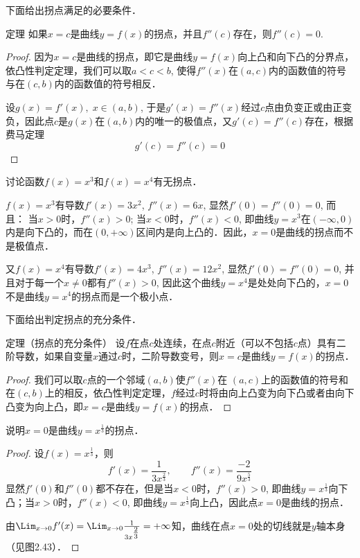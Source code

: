 下面给出拐点满足的必要条件．

\begin{blk}
    {定理} 如果$x=c$是曲线$y=f(x)$的拐点，并且$f''(c)$存在，则$f''(c)=0$.
\end{blk}

\begin{proof}
    因为$x=c$是曲线的拐点，即它是曲线$y=f(x)$向上凸和向下凸的分界点，依凸性判定定理，我们可以取$a<c<b$, 使得$f''(x)$在$(a,c)$内的函数值的符号与在$(c,b)$内的函数值的符号相反．

设$g(x)=f'(x),\; x\in (a,b)$, 于是$g'(x)=f''(x)$经过$c$点由负变正或由正变负，因此点$c$是$g(x)$在$(a,b)$内的唯一的极值点，又$g'(c)=f''(c)$存在，根据费马定理
\[g' (c) =f'' (c) =0\]
\end{proof}


\begin{example}
    讨论函数$f(x)=x^3$和$f(x)=x^4$有无拐点．
\end{example}


\begin{solution}
    $f(x)=x^3$有导数$f'(x)=3x^2$, $f''(x)=6x$, 显然$f'(0)=f''(0)=0$, 而且：
当$x>0$时，$f''(x)>0$; 当$x<0$时，$f''(x)<0$, 即曲线$y=x^3$在$(-\infty, 0)$内是向下凸的，而在$(0,+\infty)$区间内是向上凸的．因此，$x=0$是曲线的拐点而不是极值点．

又$f(x)=x^4$有导数$f'(x)=4x^3$, $f''(x)=12x^2$, 显然$f'(0)=f''(0)=0$, 并且对于每一个$x\ne 0$都有$f''(x)>0$, 因此这个曲线$y=x^4$是处处向下凸的，$x=0$不是曲线$y=x^4$的拐点而是一个极小点．
\end{solution}


下面给出判定拐点的充分条件．
    
\begin{blk}
   {定理（拐点的充分条件）} 设$f$在点$c$处连续，在点$c$附近（可以不包括$c$点）具有二阶导数，如果自变量$x$通过$c$时，二阶导数变号，则$x=c$是曲线$y=f(x)$的拐点．
\end{blk}

\begin{proof}
    我们可以取$c$点的一个邻域$(a,b)$使$f''(x)$在
$(a,c)$上的函数值的符号和在$(c,b)$上的相反，依凸性判定定理，$f$经过$c$时将由向上凸变为向下凸或者由向下凸变为向上凸，即$x=c$是曲线$y=f(x)$的拐点．
\end{proof}


\begin{example}
说明$x=0$是曲线$y=x^{\tfrac{1}{3}}$的拐点．
\end{example}

\begin{proof}
    设$f(x)=x^{\tfrac{1}{3}}$，则
\[f'(x)=\frac{1}{3x^{\tfrac{2}{3}}},\qquad f''(x)=\frac{-2}{9x^{\tfrac{5}{3}}}\]
显然$f'(0)$和$f''(0)$都不存在，但是当$x<0$时，$f''(x)>0$, 即曲线$y=x^{\tfrac{1}{3}}$向下凸；当$x>0$时，$f''(x)<0$, 即曲线$y=x^{\tfrac{1}{3}}$向上凸，因此点$x=0$是曲线的拐点．

由$\Lim_{x\to 0}f'(x)=\Lim_{x\to 0}\frac{1}{3x^{\tfrac{2}{3}}}=+\infty$知，曲线在点$x=0$处的切线就是$y$轴本身（见图2.43）．
\end{proof}

